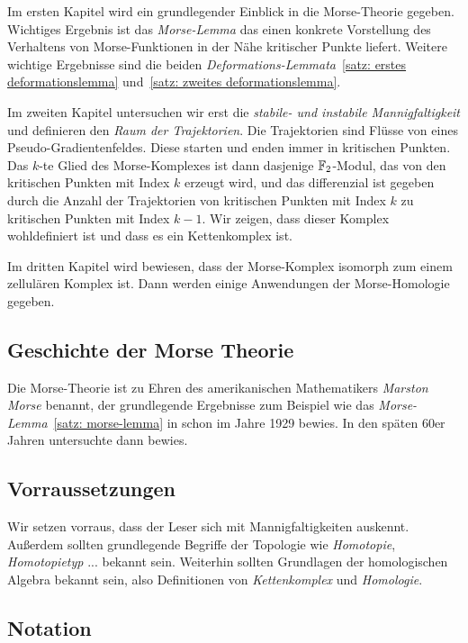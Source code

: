 \documentclass[a4paper,11pt,twoside]{scrreport}
\begin{document}
Im ersten Kapitel wird ein grundlegender Einblick in die Morse-Theorie gegeben. Wichtiges Ergebnis ist
das \textit{Morse-Lemma} das einen konkrete Vorstellung des Verhaltens von Morse-Funktionen in der Nähe 
kritischer Punkte liefert. Weitere wichtige Ergebnisse sind die beiden 
\textit{Deformations-Lemmata}~\ref{satz: erstes deformationslemma} und~\ref{satz: zweites deformationslemma}.

Im zweiten Kapitel untersuchen wir erst die \textit{stabile- und instabile Mannigfaltigkeit} und 
definieren den \textit{Raum der Trajektorien}. Die Trajektorien sind Flüsse von eines Pseudo-Gradientenfeldes.
Diese starten und enden immer in kritischen Punkten. Das $k$-te Glied des Morse-Komplexes ist dann dasjenige
${ \mathbb F }_2$-Modul, das von den kritischen Punkten mit Index $k$ erzeugt wird, und das differenzial ist gegeben
durch die Anzahl der Trajektorien von kritischen Punkten mit Index $k$ zu kritischen Punkten mit Index 
$k - 1$. Wir zeigen, dass dieser Komplex wohldefiniert ist und dass es ein Kettenkomplex ist. 

Im dritten Kapitel wird bewiesen, dass der Morse-Komplex isomorph zum einem zellulären Komplex ist. 
Dann werden einige Anwendungen der Morse-Homologie gegeben.

\subsection*{Geschichte der Morse Theorie}

Die Morse-Theorie ist zu Ehren des amerikanischen Mathematikers \textit{Marston Morse} benannt, der
grundlegende Ergebnisse zum Beispiel wie das \textit{Morse-Lemma}~\ref{satz: morse-lemma} in 
\cite{morse} schon im Jahre 1929 bewies. In den späten 60er Jahren untersuchte dann 
bewies.

\subsection*{Vorraussetzungen}

Wir setzen vorraus, dass der Leser sich mit Mannigfaltigkeiten auskennt. Außerdem sollten 
grundlegende Begriffe der Topologie wie \textit{Homotopie}, \textit{Homotopietyp} ... 
bekannt sein. Weiterhin sollten Grundlagen der homologischen Algebra bekannt sein, also 
Definitionen von \textit{Kettenkomplex} und \textit{Homologie}.

\subsection*{Notation}
\end{document}
